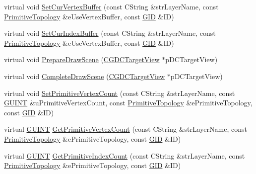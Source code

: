 \begin{DoxyCompactItemize}
\item 
virtual void \hyperlink{class_c_g_d_c_direct_x11_a7d75fde040a9b77640b17302ceb3224e}{Set\+Cur\+Vertex\+Buffer} (const C\+String \&str\+Layer\+Name, const \hyperlink{_g_types_8h_a940e3da6a9b57aae3de0b050e2a7af5e}{Primitive\+Topology} \&e\+Use\+Vertex\+Buffer, const \hyperlink{_g_types_8h_a5b96ecb16d8e437977d12cd40aa6f6d8}{G\+I\+D} \&I\+D)
\item 
virtual void \hyperlink{class_c_g_d_c_direct_x11_a6f0bf5a8d91dd9cbce37fd3b91e3cf09}{Set\+Cur\+Index\+Buffer} (const C\+String \&str\+Layer\+Name, const \hyperlink{_g_types_8h_a940e3da6a9b57aae3de0b050e2a7af5e}{Primitive\+Topology} \&e\+Use\+Vertex\+Buffer, const \hyperlink{_g_types_8h_a5b96ecb16d8e437977d12cd40aa6f6d8}{G\+I\+D} \&I\+D)
\item 
virtual void \hyperlink{class_c_g_d_c_direct_x11_a51b03aa91e1ab51c8ada59e39a5f035c}{Prepare\+Draw\+Scene} (\hyperlink{class_c_g_d_c_target_view}{C\+G\+D\+C\+Target\+View} $\ast$p\+D\+C\+Target\+View)
\item 
virtual void \hyperlink{class_c_g_d_c_direct_x11_a9e387670c58eaba319761e950669e957}{Complete\+Draw\+Scene} (\hyperlink{class_c_g_d_c_target_view}{C\+G\+D\+C\+Target\+View} $\ast$p\+D\+C\+Target\+View)
\item 
virtual void \hyperlink{class_c_g_d_c_direct_x11_a048ac37501afa9f783e979959ea972f4}{Set\+Primitive\+Vertex\+Count} (const C\+String \&str\+Layer\+Name, const \hyperlink{_g_types_8h_a415305cdf38fc38f67c037973e9a748c}{G\+U\+I\+N\+T} \&u\+Primitive\+Vertex\+Count, const \hyperlink{_g_types_8h_a940e3da6a9b57aae3de0b050e2a7af5e}{Primitive\+Topology} \&e\+Primitive\+Topology, const \hyperlink{_g_types_8h_a5b96ecb16d8e437977d12cd40aa6f6d8}{G\+I\+D} \&I\+D)
\item 
virtual \hyperlink{_g_types_8h_a415305cdf38fc38f67c037973e9a748c}{G\+U\+I\+N\+T} \hyperlink{class_c_g_d_c_direct_x11_ac05ff600dcea28d9efca1a2400d51a35}{Get\+Primitive\+Vertex\+Count} (const C\+String \&str\+Layer\+Name, const \hyperlink{_g_types_8h_a940e3da6a9b57aae3de0b050e2a7af5e}{Primitive\+Topology} \&e\+Primitive\+Topology, const \hyperlink{_g_types_8h_a5b96ecb16d8e437977d12cd40aa6f6d8}{G\+I\+D} \&I\+D)
\item 
virtual \hyperlink{_g_types_8h_a415305cdf38fc38f67c037973e9a748c}{G\+U\+I\+N\+T} \hyperlink{class_c_g_d_c_direct_x11_aff8fd5143f2449d16d7d5d45edf66f23}{Get\+Primitive\+Index\+Count} (const C\+String \&str\+Layer\+Name, const \hyperlink{_g_types_8h_a940e3da6a9b57aae3de0b050e2a7af5e}{Primitive\+Topology} \&e\+Primitive\+Topology, const \hyperlink{_g_types_8h_a5b96ecb16d8e437977d12cd40aa6f6d8}{G\+I\+D} \&I\+D)

\end{DoxyCompactItemize}
